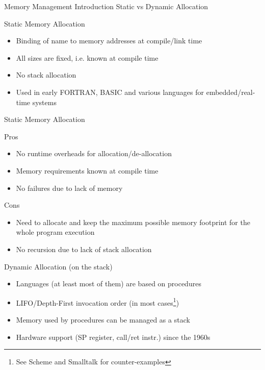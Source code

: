 \documentclass[
14pt,
aspectratio=169,
usenames,
dvipsnames,
x11names]{beamer}
\newcommand{\tik}[0]{{\color{green}\Checkmark}} %
\newcommand{\ex}[0]{{\color{red}\XSolidBrush}}  %
\begin{document}
\begin{frame}{Memory Management Introduction}
  \centering
  Static vs Dynamic Allocation
\end{frame}

\begin{frame}{Static Memory Allocation}

  \begin{itemize}  \setlength{\itemsep}{\fill}
  \item Binding of name to memory addresses at \alert{compile/link} time
  \item All sizes are fixed, i.e. \alert{known at compile time}
  \item \alert{No stack} allocation
  \item Used in early FORTRAN, BASIC and various languages for \alert{embedded/real-time systems}
  \end{itemize}

\end{frame}

\begin{frame}{Static Memory Allocation}

  Pros \tik
  \begin{itemize}  \setlength{\itemsep}{\fill}
  \item \alert{No runtime overheads} for allocation/de-allocation
  \item Memory requirements \alert{known at compile time}
  \item \alert{No failures} due to lack of memory
  \end{itemize}

  \pause

  Cons \ex
  \begin{itemize}  \setlength{\itemsep}{\fill}
  \item Need to allocate and keep \alert{the maximum possible memory footprint} for the whole program execution
  \item \alert{No recursion} due to lack of stack allocation
  \end{itemize}

\end{frame}

\begin{frame}{Dynamic Allocation (on the stack)}
  \begin{itemize}  \setlength{\itemsep}{\fill}
  \item Languages (at least most of them) are \alert{based on procedures}
  \item \alert{LIFO/Depth-First} invocation order (in most cases\footnote{See Scheme and Smalltalk for counter-examples})
  \item Memory used by procedures can be \alert{managed as a stack}
  \item \alert{Hardware support} (SP register, call/ret instr.) since the 1960s
  \end{itemize}
\end{frame}
\end{document}
